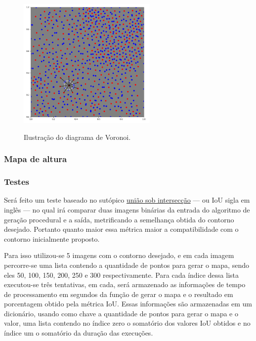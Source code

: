 \begin{figure}[!ht]
	\centering
    \caption{Ilustração do diagrama de Voronoi.}
	\includegraphics[width=0.6\textwidth]{figures/diagrama_voronoi_pontos.png}
	\label{fig:diagrama_voronoi_pontos}
\end{figure}

\subsubsection{Mapa de altura}

\subsubsection{Testes}

Será feito um teste baseado no sutópico \hyperref[sec:uniaoSobInterseccao]{união sob intersecção} — ou IoU sigla em inglês — no qual irá comparar duas imagens binárias da entrada do algoritmo de geração procedural e a saída, metrificando a semelhança obtida do contorno desejado. Portanto quanto maior essa métrica maior a compatibilidade com o contorno inicialmente proposto.

Para isso utilizou-se 5 imagens com o contorno desejado, e em cada imagem percorre-se uma lista contendo a quantidade de pontos para gerar o mapa, sendo eles 50, 100, 150, 200, 250 e 300 respectivamente. Para cada índice dessa lista executou-se três tentativas, em cada, será armazenado as informações de tempo de processamento em segundos da função de gerar o mapa e o resultado em porcentagem obtido pela métrica IoU. Essas informações são armazenadas em um dicionário, usando como chave a quantidade de pontos para gerar o mapa e o valor, uma lista contendo no índice zero o somatório dos valores IoU obtidos e no índice um o somatório da duração das execuções.

